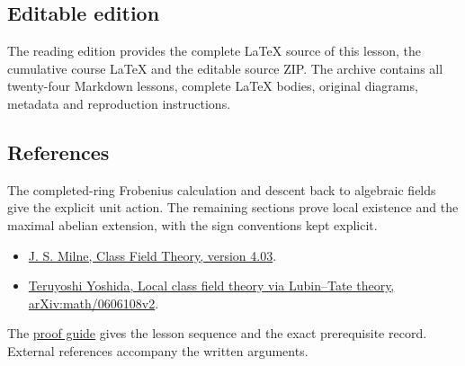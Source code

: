 \documentclass[11pt,a4paper]{article}
\newcommand{\tightlist}{\setlength{\itemsep}{0pt}\setlength{\parskip}{0pt}}
\begin{document}
\subsection{Editable edition}\label{editable-edition}

The reading edition provides the complete LaTeX source of this lesson,
the cumulative course LaTeX and the editable source ZIP. The archive
contains all twenty-four Markdown lessons, complete LaTeX bodies,
original diagrams, metadata and reproduction instructions.

\subsection{References}\label{references}

The completed-ring Frobenius calculation and descent back to algebraic
fields give the explicit unit action. The remaining sections prove local
existence and the maximal abelian extension, with the sign conventions
kept explicit.

\begin{itemize}
\tightlist
\item
  \href{https://www.jmilne.org/math/CourseNotes/CFT.pdf}{J. S. Milne,
  Class Field Theory, version 4.03}.
\item
  \href{https://arxiv.org/abs/math/0606108v2}{Teruyoshi Yoshida, Local
  class field theory via Lubin--Tate theory, arXiv:math/0606108v2}.
\end{itemize}

The \href{../free-proofs.html}{proof guide} gives the lesson sequence
and the exact prerequisite record. External references accompany the
written arguments.
\end{document}
